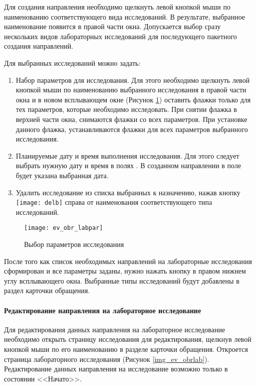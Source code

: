 {Для создания направления необходимо щелкнуть левой кнопкой мыши по наименованию соответствующего вида исследований. В результате, выбранное наименование появится в правой части окна. Допускается выбор сразу нескольких видов лабораторных исследований для последующего пакетного создания направлений. 

Для выбранных исследований можно задать:

\begin{enumerate}
 \item Набор параметров для исследования. Для этого необходимо щелкнуть левой кнопкой мыши по наименованию выбранного исследования в правой части окна и в новом всплывающем окне (Рисунок \ref{img_ev_obr_labpar}) оставить флажки только для тех параметров, которые необходимо исследовать. При снятии флажка  в верхней части окна, снимаются флажки со всех параметров. При установке данного флажка, устанавливаются флажки для всех параметров выбранного исследования.
 \item Планируемые дату и время выполнения исследования. Для этого следует выбрать нужную дату и время в полях . В созданном направлении в поле  будет указана выбранная дата. 
 \item Удалить исследование из списка выбранных к назначению, нажав кнопку \texttt{[image: delb]} справа от наименования соответствующего типа исследований.
\end{enumerate}

 \begin{figure}[ht]\centering
 	\texttt{[image: ev\_obr\_labpar]}
 	\caption{Выбор параметров исследования}
 	\label{img_ev_obr_labpar}
 \end{figure}
 
После того как список необходимых направлений на лабораторные исследования сформирован и все параметры заданы, нужно нажать кнопку  в правом нижнем углу всплывающего окна. Выбранные типы исследований будут добавлены в раздел  карточки обращения.

\paragraph{Редактирование направления на лабораторное исследование}

Для редактирования данных направления на лабораторное исследование необходимо открыть страницу исследования для редактирования, щелкнув левой кнопкой мыши по его наименованию в разделе  карточки обращения. Откроется страница лабораторного исследования (Рисунок \ref{img_ev_obrlab}). Редактирование данных направления на исследование возможно только в состоянии <<Начато>>.

}
